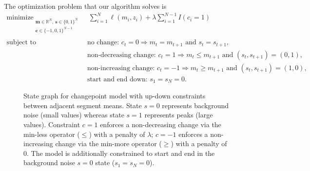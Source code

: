 \documentclass[article]{jss}
\DeclareMathOperator*{\minimize}{minimize}
\newcommand{\RR}{\mathbb R}
\begin{document}
The optimization problem that our algorithm solves is
\begin{align*}
  \label{eq:penalized_peakseg}
  \minimize_{
  \substack{
  \mathbf m\in\RR^N,\ \mathbf s\in\{0, 1\}^N\\
  \mathbf c\in\{-1, 0,1\}^{N-1}\\
  }
  } &\ \ 
      \sum_{i=1}^N \ell(m_i, z_i) + \lambda \sum_{i=1}^{N-1} I(c_i = 1) \\
  \text{subject to\ \ \ } &\ \text{no change: }c_t = 0 \Rightarrow m_t = m_{t+1}\text{ and }s_t=s_{t+1}, \\
    &\ \text{non-decreasing change: }c_t = 1 \Rightarrow m_t \leq m_{t+1}\text{ and }(s_t,s_{t+1})=(0,1),\\
    &\ \text{non-increasing change: } c_t = -1 \Rightarrow m_t \geq m_{t+1}\text{ and }(s_t,s_{t+1})=(1,0),\\
  & \ \text{start and end down: } s_1=s_N=0.
\end{align*}

\begin{figure}
  \centering
  \caption{State graph for changepoint model with up-down constraints
    between adjacent segment means. State $s=0$ represents background
    noise (small values) whereas state $s=1$ represents peaks (large
    values). Constraint $c=1$ enforces a non-decreasing change via the
    min-less operator ($\leq$) with a penalty of $\lambda$; $c=-1$
    enforces a non-increasing change via the min-more operator
    ($\geq$) with a penalty of $0$. The model is additionally
    constrained to start and end in the background noise $s=0$ state
    ($s_1=s_N=0$).}
  \label{fig:state-graph}
\end{figure}
\end{document}
